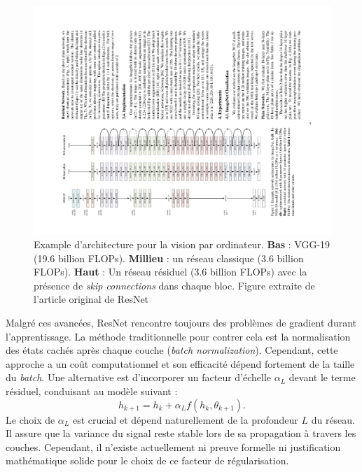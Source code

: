 \begin{figure}[H]
    \centering
    \includegraphics[width=.9\textwidth]{figs/resnet_arch.pdf}
    \caption{Example d'architecture pour la vision par ordinateur. \textbf{Bas} : VGG-19 (19.6 billion FLOPs). \textbf{Millieu} : un réseau classique (3.6 billion FLOPs). \textbf{Haut} : Un réseau résiduel (3.6 billion FLOPs) avec la présence de \textit{skip connections} dans chaque bloc. Figure extraite de l'article original de ResNet \citep{resnet}}
    \label{fig:resnet}
\end{figure}

Malgré ces avancées, ResNet rencontre toujours des problèmes de gradient durant l'apprentissage. La méthode traditionnelle pour contrer cela est la normalisation des états cachés après chaque couche (\textit{batch normalization}). Cependant, cette approche a un coût computationnel et son efficacité dépend fortement de la taille du \textit{batch}. Une alternative est d'incorporer un facteur d'échelle $\alpha_L$ devant le terme résiduel, conduisant au modèle suivant :
\[
    h_{k+1} = h_k + \alpha_L f(h_k, \theta_{k+1})
.\]
Le choix de $\alpha_L$ est crucial et dépend naturellement de la profondeur $L$ du réseau. Il assure que la variance du signal reste stable lors de sa propagation à travers les couches. Cependant, il n'existe actuellement ni preuve formelle ni justification mathématique solide pour le choix de ce facteur de régularisation.

